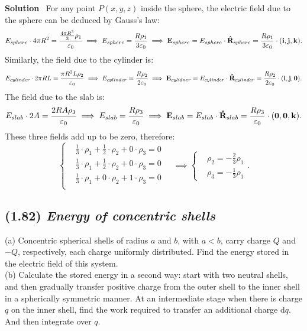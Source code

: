 \documentclass[hidelinks]{article}
\begin{document}
\vspace{0.5cm}
\noindent
\textbf{Solution} \, For any point $P(x,y,z)$ inside the sphere, the electric field due to the sphere can be deduced by Gauss's law:
$$E_{sphere} \cdot4\pi R^2 = \frac{\frac{4\pi R^3}{3} \rho _1} {\varepsilon_0} \implies E_{sphere} = \frac{R\rho_1}{3\varepsilon_0}\implies \vb{E}_{sphere} = E_{sphere} \cdot \vu{R}_{sphere}= \frac{R\rho_1}{3\varepsilon_0} \cdot (\vb{i},\vb{j},\vb{k}).$$
Similarly, the field due to the cylinder is:
$$E_{cylinder} \cdot 2\pi RL = \frac{\pi R^2L\rho_2}{\varepsilon_0} \implies E_{cylinder} = \frac{R\rho_2}{2\varepsilon_0} \implies \vb{E}_{cylidner} = E_{cylinder} \cdot \vu{R}_{cylinder} = \frac{R\rho_2}{2\varepsilon_0} \cdot (\vb{i},\vb{j},\vb{0}).$$
The field due to the slab is:
$$E_{slab} \cdot 2A = \frac{2RA\rho_3}{\varepsilon_0} \implies E_{slab} = \frac{R\rho_3}{\varepsilon_0} \implies \vb{E}_{slab} = E_{slab} \cdot \vu{R}_{slab} = \frac{R\rho_3}{\varepsilon_0} \cdot (\vb{0},\vb{0},\vb{k}).$$
These three fields add up to be zero, therefore:
$$
\left\{
\begin{aligned}
& \frac{1}{3} \cdot \rho_1 + \frac{1}{2} \cdot \rho_2 + 0\cdot \rho_3  = 0 \\
& \frac{1}{3} \cdot \rho_1+ \frac{1}{2} \cdot \rho_2 + 0\cdot \rho_3  = 0 \\
& \frac{1}{3} \cdot \rho_1+ 0 \cdot \rho_2 + 1\cdot \rho_3  = 0 \\
\end{aligned}
\right. \quad \implies  
\left\{
\begin{aligned}
& \rho_2 = - \frac{2}{3} \rho_1 \\
& \rho_3 = -\frac{1}{3} \rho_1
\end{aligned}
\right. .
$$

\subsection{(1.82) \textit{Energy of concentric shells}}
(a) Concentric spherical shells of radius $a$ and $b$, with $a < b$, carry charge $Q$ and $-Q$, respectively, each charge uniformly distributed. Find the energy stored in the electric field of this system. \\
(b) Calculate the stored energy in a second way: start with two neutral shells, and then gradually transfer positive charge from the outer shell to the inner shell in a spherically symmetric manner. At an intermediate stage when there is charge $q$ on the inner shell, find the work required to transfer an additional charge $\mathrm{d}q$. And then integrate over $q$.
\end{document}
